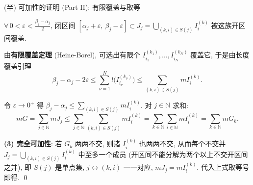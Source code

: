 \begin{frame}{(半) 可加性的证明 (Part II): 有限覆盖与取等}

$\forall\, 0 < \varepsilon < \frac{\beta_j - \alpha_j}{2}$, 闭区间
$\left[\alpha_j + \varepsilon,\ \beta_j - \varepsilon\right]
\subset J_j = \bigcup_{(k,i) \in S(j)} I_i^{(k)}$ 被这族开区间覆盖.

\pause

由\textbf{有限覆盖定理} (Heine-Borel), 可选出有限个
$I_{i_1}^{(k_1)}, \ldots, I_{i_N}^{(k_N)}$ 覆盖它, 于是由长度覆盖引理
\[
\beta_j - \alpha_j - 2\varepsilon \leqslant \sum_{\nu=1}^N l\big(I_{i_\nu}^{(k_\nu)}\big)
\leqslant \sum_{(k,i) \in S(j)} m I_i^{(k)}.
\]

\pause

令 $\varepsilon \to 0^+$ 得 $\beta_j - \alpha_j \leqslant \sum_{(k,i) \in S(j)} m I_i^{(k)}$. 对 $j \in \mathbb{N}$ 求和:
\[
m G = \sum_{j \in \mathbb{N}} m J_j
\leqslant \sum_{j \in \mathbb{N}} \sum_{(k,i) \in S(j)} m I_i^{(k)}
= \sum_{k \in \mathbb{N}} \sum_{i \in \mathbb{N}} m I_i^{(k)}
= \sum_{k \in \mathbb{N}} m G_k .
\]

\pause

\textbf{(3) 完全可加性}: 若 $G_k$ 两两不交, 则诸 $I_i^{(k)}$ 也两两不交, 从而每个不交并
$J_j = \bigcup_{(k,i) \in S(j)} I_i^{(k)}$ 中至多一个成员 (开区间不能分解为两个以上不交开区间之并), 即 $S(j)$ 是单点集, $j \longleftrightarrow (k,i)$ 一一对应, $m J_j = m I_i^{(k)}$. 代入上式取等号即得.
\qed

\end{frame}


